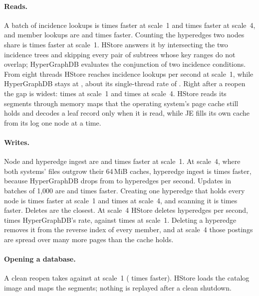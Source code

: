\paragraph{Reads.} A batch of incidence lookups is  times faster at scale~1 and  times faster at scale~4, and member lookups are  and  times faster. Counting the hyperedges two nodes share is  times faster at scale~1. HStore answers it by intersecting the two incidence trees and skipping every pair of subtrees whose key ranges do not overlap; HyperGraphDB evaluates the conjunction of two incidence conditions. From eight threads HStore reaches  incidence lookups per second at scale~1, while HyperGraphDB stays at , about its single-thread rate of . Right after a reopen the gap is widest:  times at scale~1 and  times at scale~4. HStore reads its segments through memory maps that the operating system's page cache still holds and decodes a leaf record only when it is read, while JE fills its own cache from its log one node at a time.

\paragraph{Writes.} Node and hyperedge ingest are  and  times faster at scale~1. At scale~4, where both systems' files outgrow their 64\,MiB caches, hyperedge ingest is  times faster, because HyperGraphDB drops from  to  hyperedges per second. Updates in batches of 1,000 are  and  times faster. Creating one hyperedge that holds every node is  times faster at scale~1 and  times at scale~4, and scanning it is  times faster. Deletes are the closest. At scale~4 HStore deletes  hyperedges per second,  times HyperGraphDB's rate, against  times at scale~1. Deleting a hyperedge removes it from the reverse index of every member, and at scale~4 those postings are spread over many more pages than the cache holds.

\paragraph{Opening a database.} A clean reopen takes  against  at scale~1 ( times faster). HStore loads the catalog image and maps the segments; nothing is replayed after a clean shutdown.

